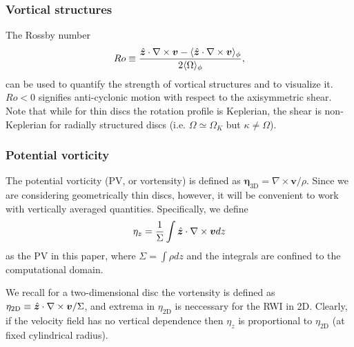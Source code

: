 \subsubsection{Vortical structures}
The Rossby number
\begin{align}
  Ro \equiv \frac{\hat{\bm{z}}\cdot\nabla\times\bm{v}-\langle \hat{\bm{z}}\cdot\nabla\times\bm{v} \rangle_\phi}{2\langle \Omega \rangle_\phi},
\end{align}
can be used to quantify the strength of vortical structures and to visualize it. 
$Ro<0$ signifies anti-cyclonic motion with respect to the axisymmetric shear. Note that while
for thin discs the rotation profile is Keplerian, the shear is non-Keplerian for radially 
structured discs (i.e. $\Omega\simeq\Omega_K$ but $\kappa\neq\Omega$).


\subsubsection{Potential vorticity}
The potential vorticity (PV, or vortensity) is defined as
$  \bm{\eta}_\mathrm{3D} = \nabla\times\bm{v}/\rho. $
Since we are considering geometrically thin discs, however, it will be
convenient to work with vertically averaged quantities. Specifically,
we define 
\begin{align}
  \eta_z = \frac{1}{\Sigma}\int \hat{\bm{z}}\cdot\nabla\times\bm{v} dz
\end{align}
as the PV in this paper, where $\Sigma = \int\rho dz$ and the
integrals are confined to the computational domain. 

We recall for a two-dimensional disc the vortensity is defined as 
$\eta_\mathrm{2D} \equiv \hat{\bm{z}}\cdot\nabla\times\bm{v}/\Sigma$, and
extrema in $\eta_\mathrm{2D}$ is neccessary for the RWI in
2D. Clearly, if the velocity field has no vertical dependence then
$\eta_z$ is proportional to $\eta_\mathrm{2D}$ (at fixed cylindrical
radius).   

